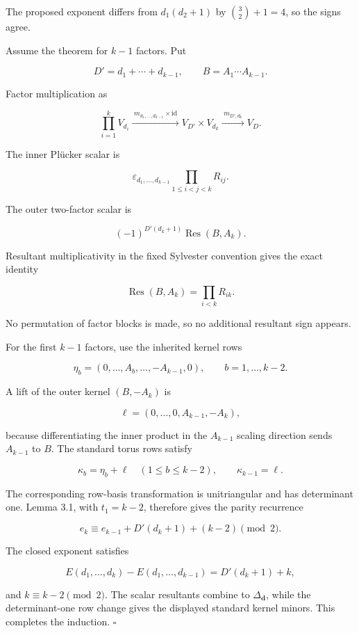 \documentclass[
  11pt,
  a4paper,
]{article}
\begin{document}
The proposed exponent differs from \(d_1(d_2+1)\) by \(\binom32+1=4\),
so the signs agree.

Assume the theorem for \(k-1\) factors. Put

\[
 D'=d_1+\cdots+d_{k-1},\qquad B=A_1\cdots A_{k-1}.
\]

Factor multiplication as

\[
 \prod_{i=1}^kV_{d_i}
 \xrightarrow{\;m_{d_1,\ldots,d_{k-1}}\times\mathrm{id}\;}
 V_{D'}\times V_{d_k}
 \xrightarrow{\;m_{D',d_k}\;}V_D.
\]

The inner Plücker scalar is

\[
 \varepsilon_{d_1,\ldots,d_{k-1}}
 \prod_{1\le i<j<k}R_{ij}.
\]

The outer two-factor scalar is

\[
 (-1)^{D'(d_k+1)}\operatorname{Res}(B,A_k).
\]

Resultant multiplicativity in the fixed Sylvester convention gives the
exact identity

\[
 \operatorname{Res}(B,A_k)=\prod_{i<k}R_{ik}.
\]

No permutation of factor blocks is made, so no additional resultant sign
appears.

For the first \(k-1\) factors, use the inherited kernel rows

\[
 \eta_b=(0,\ldots,A_b,\ldots,-A_{k-1},0),
 \qquad b=1,\ldots,k-2.
\]

A lift of the outer kernel \((B,-A_k)\) is

\[
 \ell=(0,\ldots,0,A_{k-1},-A_k),
\]

because differentiating the inner product in the \(A_{k-1}\) scaling
direction sends \(A_{k-1}\) to \(B\). The standard torus rows satisfy

\[
 \kappa_b=\eta_b+\ell\quad(1\le b\le k-2),
 \qquad \kappa_{k-1}=\ell.
\]

The corresponding row-basis transformation is unitriangular and has
determinant one. Lemma 3.1, with \(t_1=k-2\), therefore gives the parity
recurrence

\[
 e_k\equiv e_{k-1}+D'(d_k+1)+(k-2)\pmod2.
\]

The closed exponent satisfies

\[
 E(d_1,\ldots,d_k)-E(d_1,\ldots,d_{k-1})
 =D'(d_k+1)+k,
\]

and \(k\equiv k-2\pmod2\). The scalar resultants combine to
\(\Delta_{\mathbf d}\), while the determinant-one row change gives the
displayed standard kernel minors. This completes the induction.
\(\square\)
\end{document}
